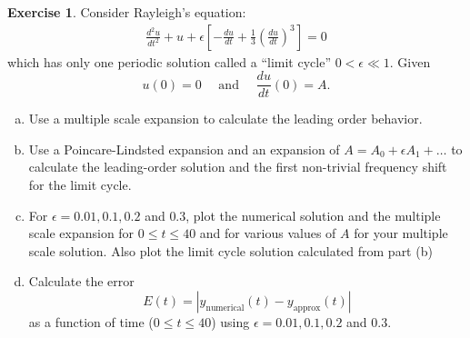 \documentclass[12pt]{article}
\newcommand{\abs}[1]{ \left| #1 \right| }
\theoremstyle{definition}
\newtheorem{exer}{Exercise}
\theoremstyle{remark}
\begin{document}
\begin{exer}
Consider Rayleigh’s equation:
\begin{align*}
    \frac{d^{2} u}{dt^{2}} + u + \epsilon \left[ -\frac{du}{dt}  + \frac{1}{3} \left( \frac{du}{dt} \right)^{3}\right] = 0
\end{align*}
which has only one periodic solution called a “limit cycle” $0 < \epsilon \ll 1$. Given
\begin{equation*}
    u(0) = 0 \quad \text{ and } \quad \frac{d u}{dt}(0) = A.
\end{equation*}

\begin{enumerate}[(a)]
    \item Use a multiple scale expansion to calculate the leading order behavior.
    \item Use a Poincare-Lindsted expansion and an expansion of $A = A_0 + \epsilon A_1 + \ldots$ to calculate the leading-order solution and the first non-trivial frequency shift for the limit cycle.
    \item For $\epsilon = 0.01, 0.1, 0.2$ and $0.3$, plot the numerical solution and the multiple scale expansion for $0 \leq t \leq 40$ and for various values of $A$ for your multiple scale solution. Also plot the limit cycle solution calculated from part (b)
    \item Calculate the error
\begin{equation*}
    E(t) = \abs{ y_{\text{numerical}}(t) - y_{\text{approx}}(t) }
\end{equation*}
as a function of time ($0 \leq t \leq 40$) using $\epsilon = 0.01,0.1,0.2$ and $0.3$.
\end{enumerate}
\end{exer}
\end{document}
